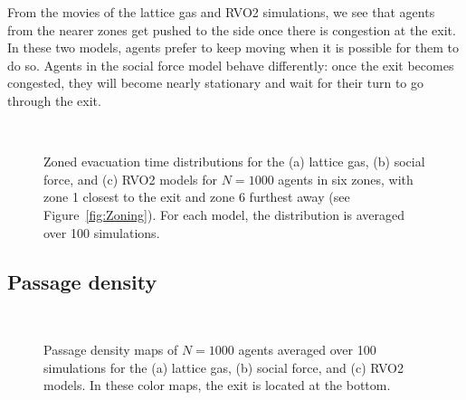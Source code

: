 From the movies of the lattice gas and RVO2 simulations, we see that agents from the nearer zones get pushed to the side once there is congestion at the exit. In these two models, agents prefer to keep moving when it is possible for them to do so. Agents in the social force model behave differently: once the exit becomes congested, they will become nearly stationary and wait for their turn to go through the exit.



\begin{figure*}[!tb]
\centering
{}
\hspace{1cm}
\\
\caption[Zoned evacuation time distributions]{Zoned evacuation time distributions for the (a) lattice gas, (b) social force, and (c) RVO2 models for $N = 1000$ agents in six zones, with zone 1 closest to the exit and zone 6 furthest away (see Figure~\ref{fig:Zoning}). For each model, the distribution is averaged over 100 simulations.}
\label{fig:ZoningEvac}
\end{figure*}



\subsection{Passage density}

\begin{figure*}[!tb]
\centering
{}
\hspace{2cm}
\\
\caption[Passage density maps]{Passage density maps of $N = 1000$ agents averaged over 100 simulations for the (a) lattice gas, (b) social force, and (c) RVO2 models. In these color maps, the exit is located at the bottom.}
\label{fig:DensityMap}
\end{figure*}


